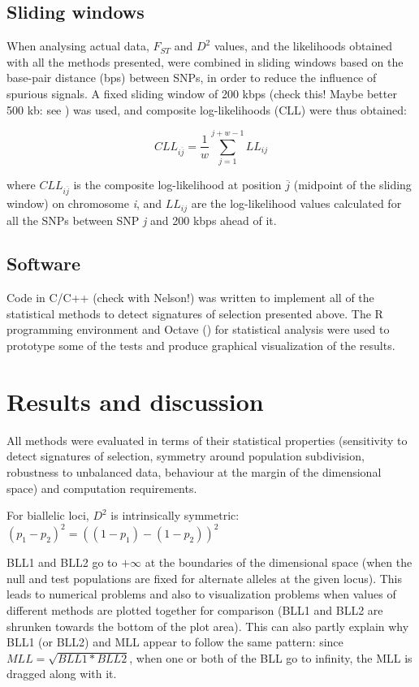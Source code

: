 \documentclass{bmcart}
\begin{document}
\subsection*{Sliding windows}
When analysing actual data, $F_{ST}$ and $D^2$ values, and the likelihoods obtained with all the
methods presented, were combined in sliding windows based on the
base-pair distance (bps) between SNPs, in order to reduce the influence of spurious signals.
A fixed sliding window of 200 kbps (check this! Maybe better 500 kb: see
\cite{qanbari2011application}) was used, and composite log-likelihoods (CLL) were thus obtained:

\begin{equation}
CLL_{i\overline{j}}=\frac{1}{w}\sum_{j=1}^{j+w-1}LL_{ij}
\end{equation}

where $CLL_{i\overline{j}}$ is the composite log-likelihood at position \emph{$\overline{j}$}
(midpoint of the sliding window) on chromosome \emph{i}, and $LL_{ij}$
are the log-likelihood values calculated for all the SNPs between SNP
\emph{j} and 200 kbps ahead of it.

\subsection*{Software}
Code in C/C++ (check with Nelson!) was written to implement all of the statistical methods to
detect signatures of selection presented above. The R programming
environment and Octave (\cite{eaton2002gnu}) for statistical analysis were used to prototype some of the
tests and produce graphical visualization of the results.


\section*{Results and discussion}
All methods were evaluated in terms of their statistical properties
(sensitivity to detect signatures of selection, symmetry around
population subdivision, robustness to unbalanced data, behaviour at the
margin of the dimensional space) and computation requirements.

For biallelic loci, $D^2$ is intrinsically symmetric: $(p_1-p_2)^2 =
((1-p_1)-(1-p_2))^2$

BLL1 and BLL2 go to $+\infty$ at the boundaries of the dimensional space
(when the null and test populations are fixed for alternate alleles at
the given locus). This leads to numerical problems and also to
visualization problems when values of different methods are plotted
together for comparison (BLL1 and BLL2 are shrunken towards the bottom
of the plot area). This can also partly explain why BLL1 (or BLL2) and
MLL appear to follow the same pattern: since $MLL=\sqrt{BLL1*BLL2}$,
when one or both of the BLL go to infinity, the MLL is dragged along
with it.
\end{document}
